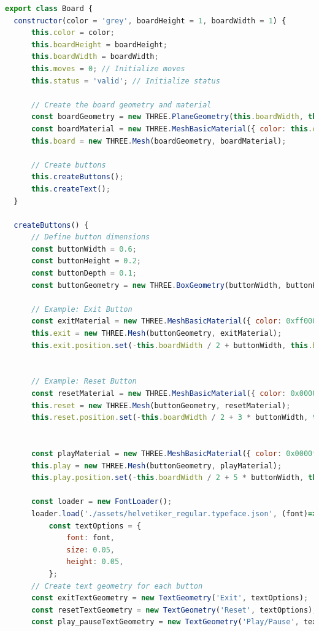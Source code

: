 \documentclass{article}
\begin{document}
\begin{lstlisting}[language=JavaScript, caption={JS Class for Board}]
export class Board {
  constructor(color = 'grey', boardHeight = 1, boardWidth = 1) {
      this.color = color;
      this.boardHeight = boardHeight;
      this.boardWidth = boardWidth;
      this.moves = 0; // Initialize moves
      this.status = 'valid'; // Initialize status

      // Create the board geometry and material
      const boardGeometry = new THREE.PlaneGeometry(this.boardWidth, this.boardHeight);
      const boardMaterial = new THREE.MeshBasicMaterial({ color: this.color, side: THREE.DoubleSide });
      this.board = new THREE.Mesh(boardGeometry, boardMaterial);

      // Create buttons
      this.createButtons();
      this.createText();
  }

  createButtons() {
      // Define button dimensions
      const buttonWidth = 0.6;
      const buttonHeight = 0.2;
      const buttonDepth = 0.1;
      const buttonGeometry = new THREE.BoxGeometry(buttonWidth, buttonHeight, buttonDepth);

      // Example: Exit Button
      const exitMaterial = new THREE.MeshBasicMaterial({ color: 0xff0000 }); // red color
      this.exit = new THREE.Mesh(buttonGeometry, exitMaterial);
      this.exit.position.set(-this.boardWidth / 2 + buttonWidth, this.boardHeight / 2 - buttonHeight, 0.1);
      

      // Example: Reset Button
      const resetMaterial = new THREE.MeshBasicMaterial({ color: 0x0000ff }); // blue color
      this.reset = new THREE.Mesh(buttonGeometry, resetMaterial);
      this.reset.position.set(-this.boardWidth / 2 + 3 * buttonWidth, this.boardHeight / 2 - buttonHeight, 0.1);
      

      const playMaterial = new THREE.MeshBasicMaterial({ color: 0x0000ff }); // blue color
      this.play = new THREE.Mesh(buttonGeometry, playMaterial);
      this.play.position.set(-this.boardWidth / 2 + 5 * buttonWidth, this.boardHeight / 2 - buttonHeight, 0.1);

      const loader = new FontLoader();
      loader.load('./assets/helvetiker_regular.typeface.json', (font)=>{
          const textOptions = {
              font: font,
              size: 0.05,
              height: 0.05,
          };
      // Create text geometry for each button
      const exitTextGeometry = new TextGeometry('Exit', textOptions);
      const resetTextGeometry = new TextGeometry('Reset', textOptions);
      const play_pauseTextGeometry = new TextGeometry('Play/Pause', textOptions);


\end{lstlisting}
\end{document}
